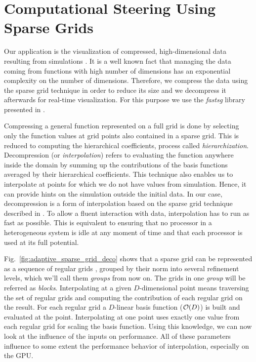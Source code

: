 \section{Computational Steering Using Sparse Grids}


Our application is the visualization of compressed, high-dimensional data
resulting from simulations \cite{Butnaru201156}. It is a well known fact that
managing the data coming from functions with high number of dimensions has an
exponential complexity on the number of dimensions. Therefore, we compress the
data using the sparse grid technique in order to reduce its size and we
decompress it afterwards for real-time visualization. For this purpose we use
the \textit{fastsg} library presented in \cite{murarasu12fastsg:}.

Compressing a general function represented on a full grid is done by selecting
only the function values at grid points also contained in a sparse grid. This is
reduced to computing the hierarchical coefficients, process called
\textit{hierarchization}. Decompression (or \textit{interpolation}) refers to
evaluating the function anywhere inside the domain by summing up the
contributions of the basis functions averaged by their hierarchical
coefficients. This technique also enables us to interpolate at points for which
we do not have values from simulation. Hence, it can provide hints on the
simulation outside the initial data. In our case, decompression is a form of
interpolation based on the sparse grid technique described in
\cite{CambridgeJournals:227245}. To allow a fluent interaction with data,
interpolation has to run as fast as possible. This is equivalent to ensuring
that no processor in a heterogeneous system is idle at any moment of time and
that each processor is used at its full potential.

Fig.~\ref{fig:adaptive_sparse_grid_deco} shows that a sparse grid can be
represented as a sequence of regular grids
\cite{Murarasu:2011:CDS:1941553.1941559}, grouped by their norm into several
refinement levels, which we'll call them \textit{groups} from now on. The grids
in one \textit{group} will be referred as \textit{blocks}.
Interpolating at a given $D$-dimensional point means traversing the set of
regular grids and computing the contribution of each regular grid on the result. For
each regular grid a $D$-linear basis function ($\Otime{D}$) is built and
evaluated at the point. Interpolating at one point uses exactly one value from each
regular grid for scaling the basis function. Using this knowledge, we can now
look at the influence of the inputs on performance. All of these parameters
influence to some extent the performance behavior of interpolation, especially
on the GPU.


